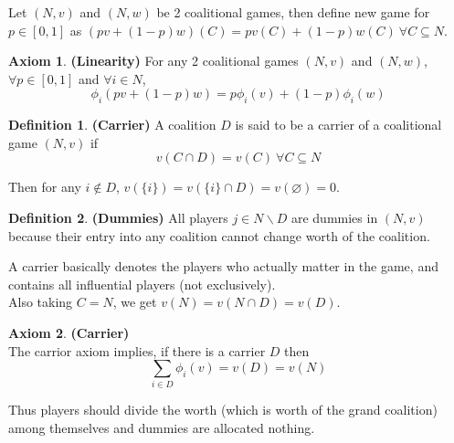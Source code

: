 \documentclass{article}
\theoremstyle{definition}
\newtheorem{defn}{Definition}[section]
\newtheorem{ax}{Axiom}[section]
\begin{document}
Let $(N,v)$ and $(N,w)$ be 2 coalitional games, then define new game for $p \in [0,1]$ as $(pv + (1-p)w)(C) = pv(C) + (1-p)w(C) ~\forall C\subseteq N$.
\begin{ax}
\textbf{(Linearity)} For any 2 coalitional games $(N,v)$ and $(N,w)$, $\forall p \in [0,1]$ and $\forall i \in N$, $$\phi_i(pv + (1-p)w) = p\phi_i(v) + (1-p)\phi_i(w)$$
\end{ax}
\begin{defn}
\textbf{(Carrier)} A coalition $D$ is said to be a carrier of a coalitional game $(N,v)$ if $$v(C\cap D) = v(C) ~\forall C\subseteq N$$
\end{defn}
Then for any $i \notin D$, $v(\{i\}) = v(\{i\} \cap D) = v(\varnothing) = 0$.
\begin{defn}
\textbf{(Dummies)} All players $j \in N\backslash D$ are dummies in $(N,v)$ because their entry into any coalition cannot change worth of the coalition.
\end{defn}
A carrier basically denotes the players who actually matter in the game, and contains all influential players (not exclusively).\\
Also taking $C = N$, we get $v(N) = v(N \cap D) = v(D)$. 
\begin{ax}
\textbf{(Carrier)}\\
The carrior axiom implies, if there is a carrier $D$ then $$\sum_{i \in D}\phi_i(v) = v(D) = v(N)$$
\end{ax}
Thus players should divide the worth (which is worth of the grand coalition) among themselves and dummies are allocated nothing.
\end{document}
